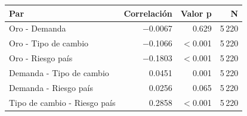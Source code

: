\begin{tabularx}{\linewidth}{>{\raggedright\arraybackslash}Xrrr}
\toprule
Par & Correlación & Valor p & N \\
\midrule
Oro - Demanda & $-$0.0067 & 0.629 & 5\,220 \\
Oro - Tipo de cambio & $-$0.1066 & $<$0.001 & 5\,220 \\
Oro - Riesgo país & $-$0.1803 & $<$0.001 & 5\,220 \\
Demanda - Tipo de cambio & 0.0451 & 0.001 & 5\,220 \\
Demanda - Riesgo país & 0.0256 & 0.065 & 5\,220 \\
Tipo de cambio - Riesgo país & 0.2858 & $<$0.001 & 5\,220 \\
\bottomrule
\end{tabularx}
